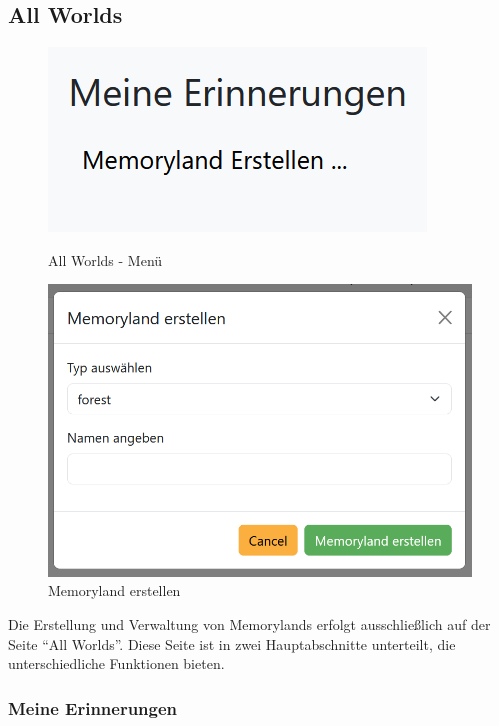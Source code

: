 \subsection{All Worlds}

\begin{figure}
    \centering
    \includegraphics[scale=0.7]{pics/all_worlds_teil1.PNG}
    \caption{All Worlds - Menü}
    \label{fig:all-worlds-menu}

    \vspace{1cm}

    \centering
    \includegraphics[scale=0.5]{pics/all_worlds_teil1_button.PNG}
    \caption{Memoryland erstellen}
    \label{fig:all-worlds-memoryland-erstellen}

\end{figure}

Die Erstellung und Verwaltung von Memorylands erfolgt ausschlie\ss{}lich auf der Seite 
``All Worlds''. Diese Seite ist in zwei Hauptabschnitte unterteilt, die 
unterschiedliche Funktionen bieten.

\subsubsection{Meine Erinnerungen}

